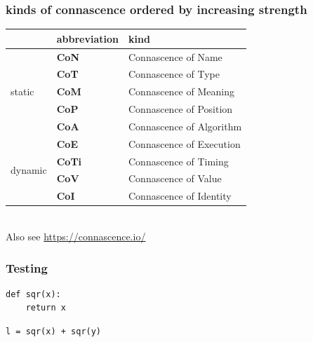 \documentclass[aspectratio=169,12pt,xcolor=dvipsnames]{beamer}
\begin{document}
\begin{frame}
  \frametitle{kinds of connascence ordered by increasing strength}
  \begin{center}
    \begin{tabular}{|l|l|l|}\hline
      & \textbf{abbreviation}  & \textbf{kind} \\\hline
      \multirow{5}{*}{static}  & \textbf{CoN}  & Connascence of Name\\
      & \textbf{CoT}  & Connascence of Type\\
      & \textbf{CoM}  & Connascence of Meaning\\
      & \textbf{CoP}  & Connascence of Position\\
      & \textbf{CoA}  & Connascence of Algorithm\\\hline
      \multirow{4}{*}{dynamic} & \textbf{CoE}  & Connascence of Execution\\
      & \textbf{CoTi} & Connascence of Timing\\
      & \textbf{CoV}  & Connascence of Value\\
      & \textbf{CoI}  & Connascence of Identity\\\hline
    \end{tabular}\\\bigskip
    Also see \url{https://connascence.io/}
  \end{center}
\end{frame}

\begin{frame}[fragile]
  \frametitle{Testing}
  \begin{center}
    \begin{minipage}[c]{.35\textwidth}
      \begin{verbatim}
def sqr(x):
    return x
      \end{verbatim}
    \end{minipage}
    \begin{minipage}[c]{.35\textwidth}
      \begin{verbatim}
l = sqr(x) + sqr(y)
      \end{verbatim}
    \end{minipage}
  \end{center}
\end{frame}


\end{document}
